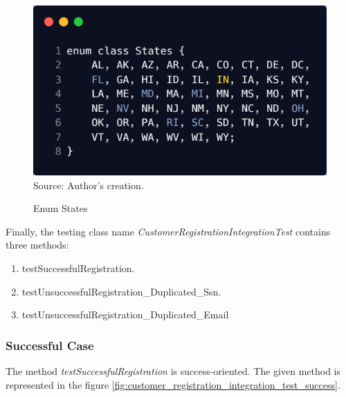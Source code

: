 \begin{figure}[H]
	\centering
	\caption{Enum States}
	\includegraphics[width=1\linewidth]{figures/states_enum.png}
	\footnotesize Source: Author's creation.
	\label{fig:states}
\end{figure}

Finally, the testing class name \textit{CustomerRegistrationIntegrationTest} contains 
three methods:

\begin{enumerate}
	\item testSuccessfulRegistration.
	\item testUnsuccessfulRegistration\_Duplicated\_Ssn.
	\item testUnsuccessfulRegistration\_Duplicated\_Email
\end{enumerate}

\subsubsection{Successful Case}
\label{customer_registration_successful_test}

The method \textit{testSuccessfulRegistration} is success-oriented. The given method is represented in the figure \ref{fig:customer_registration_integration_test_success}. 

